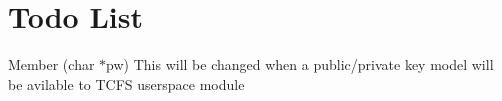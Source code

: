 \chapter{Todo List}
\hypertarget{todo}{}\label{todo}

\begin{DoxyRefList}
\item[Member \doxylink{tcfs__helper__tools_8c_a1bef5d2cdd74c07b3ae025c6424dfbd5}{get\+\_\+pass} (char \texorpdfstring{$\ast$}{*}pw)]\label{todo__todo000001}%
%
This will be changed when a public/private key model will be avilable to TCFS userspace module 
\end{DoxyRefList}
